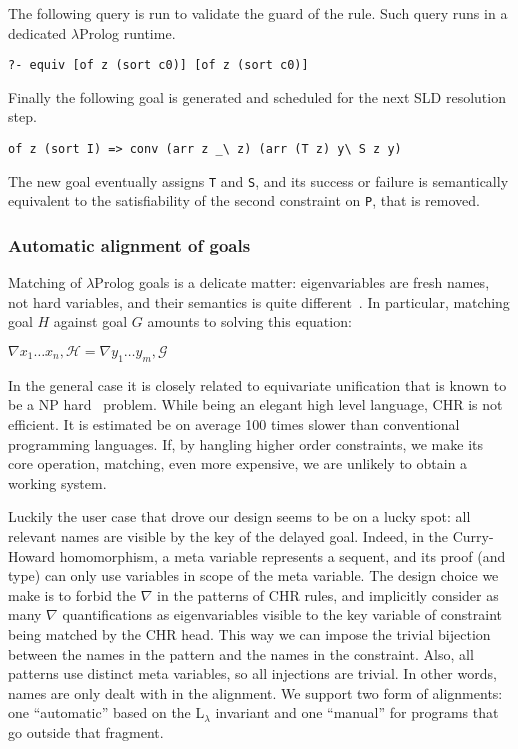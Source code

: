 \documentclass{easychair}
\begin{document}
The following query is run to validate the guard of the rule.
Such query runs in a dedicated $\lambda$Prolog runtime.

\begin{Verbatim}
?- equiv [of z (sort c0)] [of z (sort c0)]
\end{Verbatim}

Finally the following  goal is generated and scheduled for the next
SLD resolution step.

\begin{Verbatim}
of z (sort I) => conv (arr z _\ z) (arr (T z) y\ S z y)
\end{Verbatim}

The new goal eventually assigns \verb+T+ and \verb+S+, and its success
or failure is semantically equivalent to the satisfiability of the
second constraint on \verb+P+, that is removed.

\subsubsection{Automatic alignment of goals}
\label{sec:realchr}

Matching of $\lambda$Prolog goals is a delicate matter: eigenvariables
are fresh names, not hard variables, and their semantics is quite
different~\cite{nabla}.  
In particular, matching goal $H$ against goal $G$ amounts
to solving this equation:

\begin{math}
 \nabla x_1\ldots x_n, \mathcal{H} = \nabla y_1\ldots y_m, \mathcal{G}
\end{math}

In the general case it is closely related to equivariate unification
that is known to be a NP hard~\cite{Cheney2004} problem.  While being
an elegant high level language, CHR is not efficient.  It is estimated
be on average 100 times slower than conventional programming
languages.  If, by hangling higher order constraints, we make its core
operation, matching, even more expensive, we are unlikely to obtain a
working system.

Luckily the user case that drove our design seems to be on a lucky
spot: all relevant names are visible by the key of the delayed goal.
Indeed, in the Curry-Howard homomorphism, a meta variable represents a
sequent, and its proof (and type) can only use variables in scope of
the meta variable.  The design choice we make is to forbid the
$\nabla$ in the patterns of CHR rules, and implicitly consider as many
$\nabla$ quantifications as eigenvariables visible to the key variable
of constraint being matched by the CHR head.  This way we can impose
the trivial bijection between the names in the pattern and the names
in the constraint.  Also, all patterns use distinct meta variables, so
all injections are trivial.  In other words, names are only dealt with
in the alignment.
We support two form of alignments: one ``automatic'' based on the
L$_\lambda$ invariant and one ``manual'' for programs that go
outside that fragment.
\end{document}
